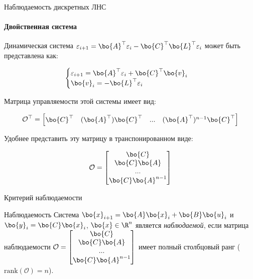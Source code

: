 \documentclass{beamer}
\begin{document}
\begin{frame}{Наблюдаемость дискретных ЛНС}
	\framesubtitle{Двойственная система}
	\begin{flushleft}
		
		Динамическая система $\varepsilon_{i+1} = \bo{A}^\top \varepsilon_i - \bo{C}^\top \bo{L}^\top \varepsilon_i$ может быть представлена как:
		
		\begin{equation}
			\begin{cases}
				\varepsilon_{i+1} = \bo{A}^\top \varepsilon_i + \bo{C}^\top \bo{v}_i \\
				\bo{v}_i = - \bo{L}^\top \varepsilon_i
			\end{cases}
		\end{equation}
		
		Матрица управляемости этой системы имеет вид:
		
		\begin{equation}
			\mathcal{O}^\top = \begin{bmatrix}
				\bo{C}^\top &
				(\bo{A}^\top) \bo{C}^\top & ... &
				(\bo{A}^\top)^{n - 1} \bo{C}^\top
			\end{bmatrix}
		\end{equation}
		
		Удобнее представить эту матрицу в транспонированном виде:
		
		\begin{equation}
			\mathcal{O} = \begin{bmatrix}
				\bo{C} \\
				\bo{C}\bo{A}  \\ ... \\
				\bo{C}\bo{A}^{n - 1}
			\end{bmatrix}
		\end{equation}
		
	\end{flushleft}
\end{frame}


\begin{frame}{Критерий наблюдаемости}
	\begin{flushleft}
		
		\begin{block}{Наблюдаемость}
			Система $\bo{x}_{i+1} = \bo{A}  \bo{x}_i + \bo{B} \bo{u}_i$ и $\bo{y}_i = \bo{C}  \bo{x}_i$, $\bo{x} \in \R^n$ является \emph{наблюдаемой}, если матрица наблюдаемости $\mathcal{O} = \begin{bmatrix}
				\bo{C} \\
				\bo{C}\bo{A}  \\ ... \\
				\bo{C}\bo{A}^{n - 1}
			\end{bmatrix}$ имеет полный столбцовый ранг ($\text{rank}(\mathcal{O}) = n$).
		\end{block}
		
	\end{flushleft}
\end{frame}
\end{document}
